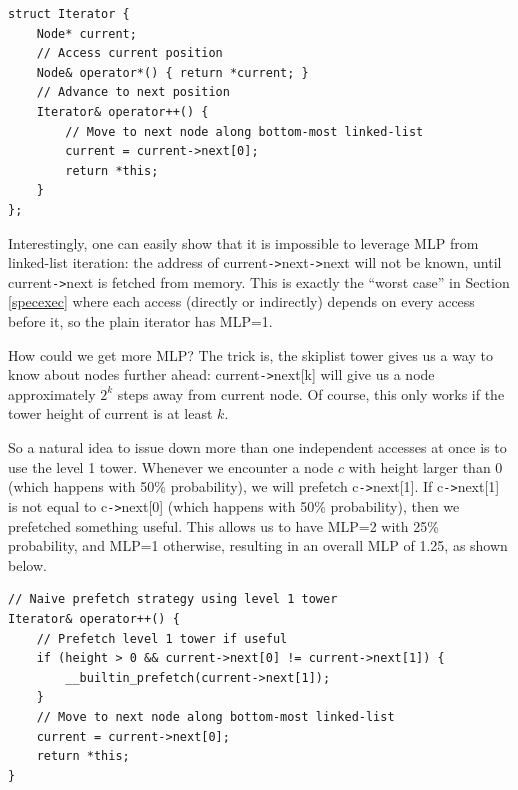 \documentclass[11pt, usletter]{article}
\begin{document}
\singlespacing\begin{codebox}
\begin{verbatim}
struct Iterator {
    Node* current;
    // Access current position
    Node& operator*() { return *current; }
    // Advance to next position
    Iterator& operator++() { 
        // Move to next node along bottom-most linked-list 
        current = current->next[0]; 
        return *this;
    }
};
\end{verbatim}
\end{codebox}\doublespacing

Interestingly, one can easily show that it is impossible to leverage MLP 
from linked-list iteration: the address of current\verb|->|next\verb|->|next will not be known, 
until current\verb|->|next is fetched from memory. 
This is exactly the ``worst case'' in Section \ref{specexec} where each access (directly or indirectly) depends on every access before it, 
so the plain iterator has MLP=1.

How could we get more MLP? 
The trick is, the skiplist tower gives us a way to know about nodes further ahead: 
current\verb|->|next[k] will give us a node approximately $2^k$ steps away from current node.
Of course, this only works if the tower height of current is at least $k$.

So a natural idea to issue down more than one independent accesses at once is to use the level 1 tower. 
Whenever we encounter a node $c$ with height larger than 0 (which happens with 50\% probability), we will prefetch c\verb|->|next[1]. 
If c\verb|->|next[1] is not equal to c\verb|->|next[0] (which happens with 50\% probability), 
then we prefetched something useful. This allows us to have MLP=2 with 25\% probability, and MLP=1 otherwise, 
resulting in an overall MLP of 1.25, as shown below.

\singlespacing\begin{codebox}
\begin{verbatim}
// Naive prefetch strategy using level 1 tower
Iterator& operator++() { 
    // Prefetch level 1 tower if useful
    if (height > 0 && current->next[0] != current->next[1]) {
        __builtin_prefetch(current->next[1]);
    }
    // Move to next node along bottom-most linked-list 
    current = current->next[0]; 
    return *this;
}
\end{verbatim}
\end{codebox}\doublespacing
\end{document}
